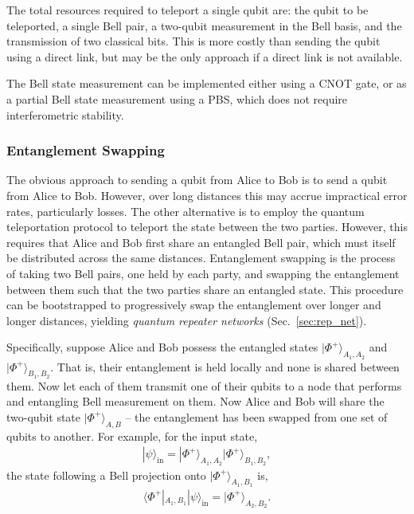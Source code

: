 \documentclass[aps,rmp,twocolumn,amsmath,amssymb,nofootinbib,superscriptaddress]{revtex4}
\newcommand{\bra}[1]{\langle#1|}
\newcommand{\ket}[1]{|#1\rangle}
\begin{document}
The total resources required to teleport a single qubit are: the qubit to be teleported, a single Bell pair, a two-qubit measurement in the Bell basis, and the transmission of two classical bits. This is more costly than sending the qubit using a direct link, but may be the only approach if a direct link is not available.

The Bell state measurement can be implemented either using a CNOT gate, or as a partial Bell state measurement using a PBS, which does not require interferometric stability.

%
%

\subsubsection{Entanglement Swapping} \label{sec:repeater}

The obvious approach to sending a qubit from Alice to Bob is to send a qubit from Alice to Bob. However, over long distances this may accrue impractical error rates, particularly losses. The other alternative is to employ the quantum teleportation protocol to teleport the state between the two parties. However, this requires that Alice and Bob first share an entangled Bell pair, which must itself be distributed across the same distances. Entanglement swapping is the process of taking two Bell pairs, one held by each party, and swapping the entanglement between them such that the two parties share an entangled state. This procedure can be bootstrapped to progressively swap the entanglement over longer and longer distances, yielding \emph{quantum repeater networks} (Sec.~\ref{sec:rep_net}).

Specifically, suppose Alice and Bob possess the entangled states $\ket{\Phi^+}_{A_1,A_2}$ and $\ket{\Phi^+}_{B_1,B_2}$. That is, their entanglement is held locally and none is shared between them. Now let each of them transmit one of their qubits to a node that performs and entangling Bell measurement on them. Now Alice and Bob will share the two-qubit state $\ket{\Phi^+}_{A,B}$ -- the entanglement has been swapped from one set of qubits to another. For example, for the input state,
\begin{align}
\ket\psi_\mathrm{in} = \ket{\Phi^+}_{A_1,A_2} \ket{\Phi^+}_{B_1,B_2},
\end{align}
the state following a Bell projection onto $\ket{\Phi^+}_{A_1,B_1}$ is,
\begin{align}
\bra{\Phi^+}_{A_1,B_1} \ket\psi_\mathrm{in} = \ket{\Phi^+}_{A_2,B_2}.
\end{align}
\end{document}
